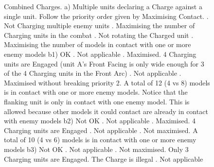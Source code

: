 \newcommand{\combinedchargesCharge}{\smallfontsize\flufffont{Charge!}}
\newcommand{\combinedchargesA}{a)}
\newcommand{\combinedchargesBOne}{b1)}
\newcommand{\combinedchargesBTwo}{b2)}
\newcommand{\combinedchargesBThree}{b3)}
\newcommand{\combinedchargesBFour}{b4)}

\begin{figure}[!htbp]
\renewcommand{\figbiglettersize}{12}
	\begin{minipage}{0.5\textwidth}
	\def\svgwidth{\textwidth}
	
	\end{minipage}\hfill\begin{minipage}{0.47\textwidth}
	\caption{Combined Charges.\captionpar
	a) Multiple units declaring a Charge against a single unit. Follow the priority order given by Maximising Contact.\captionlist
	. Not Charging multiple enemy units\newline
	. Maximising the number of Charging units in the combat\newline
	. Not rotating the Charged unit\newline
	. Maximising the number of models in contact with one or more enemy models
	\captionpar
	b1) OK\captionlist
	. Not applicable\newline
	. Maximised. 4 Charging units are Engaged (unit A's Front Facing is only wide enough for 3 of the 4 Charging units in the Front Arc)\newline
	. Not applicable\newline
	. Maximised without breaking priority 2. A total of 12 (4 vs 8) models is in contact with one or more enemy models. Notice that the flanking unit is only in contact with one enemy model. This is allowed because other models it could contact are already in contact with enemy models
	\captionpar
	b2) Not OK\captionlist
	. Not applicable\newline
	. Maximised. 4 Charging units are Engaged\newline
	. Not applicable\newline
	. Not maximised. A total of 10 (4 vs 6) models is in contact with one or more enemy models
	\captionpar
	b3) Not OK\captionlist
	. Not applicable\newline
	. Not maximised. Only 3 Charging units are Engaged. The Charge is illegal\newline
	. Not applicable\newline
}
\end{minipage}
\end{figure}
